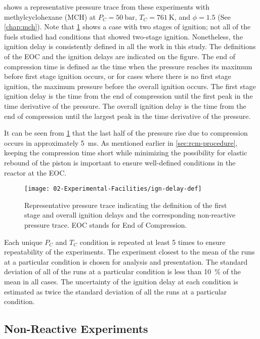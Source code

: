 \documentclass[../main.tex]{subfiles}
\begin{document}
 shows a representative pressure trace from
these experiments with methylcyclohexane (MCH) at $P_C= \SI{50}{\bar}$, $T_C=\SI{761}{\kelvin}$,
and $\phi=\num{1.5}$ (See \cref{chap:mch}). Note that \cref{fig:ig-delay-def}
shows a case with two stages of ignition; not all of the fuels studied
had conditions that showed two-stage ignition. Nonetheless, the ignition
delay is consistently defined in all the work in this study. The
definitions of the EOC and the ignition delays are indicated on the figure.
The end of compression time is defined as the time when the pressure
reaches its maximum before first stage ignition occurs, or for cases
where there is no first stage ignition, the maximum pressure before
the overall ignition occurs. The first stage ignition delay is the time
from the end of compression until the first peak in the time derivative
of the pressure. The overall ignition delay is the time from the end of
compression until the largest peak in the time derivative of the pressure.

It can be seen from \cref{fig:ig-delay-def} that the last half of
the pressure rise due to compression occurs in approximately \SI{5}{\milli\second}.
As mentioned earlier in \cref{sec:rcm-procedure}, keeping the compression time short while minimizing
the possibility for elastic rebound of the piston is important to
ensure well-defined conditions in the reactor at the EOC.

\begin{figure}
    \texttt{[image: 02-Experimental-Facilities/ign-delay-def]}
    \caption{Representative pressure trace indicating the definition of
    the first stage and overall ignition delays and the corresponding
    non-reactive pressure trace. EOC stands for End of Compression.}
    \label{fig:ig-delay-def}
\end{figure}

Each unique $P_C$ and $T_C$ condition is repeated at least 5 times to
ensure repeatability of the experiments. The experiment closest to the
mean of the runs at a particular condition is chosen for analysis and
presentation. The standard deviation of all of the runs at a particular
condition is less than \SI{10}{\percent} of the mean in all cases. The uncertainty of
the ignition delay at each condition is estimated as twice the standard
deviation of all the runs at a particular condition.

\subsection{Non-Reactive Experiments}
\end{document}
